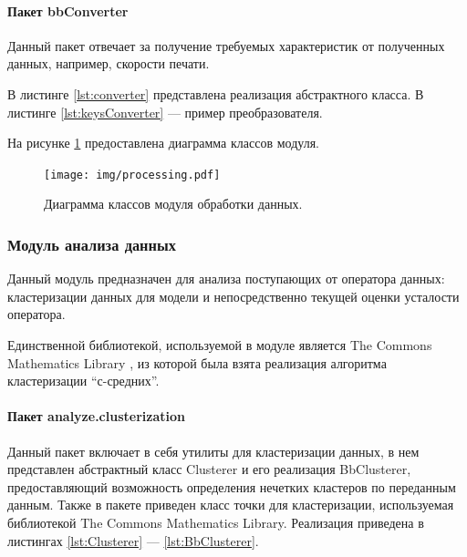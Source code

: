 

\paragraph{Пакет bbConverter \newline}
Данный пакет отвечает за получение требуемых характеристик от полученных данных, например, скорости печати.

В листинге \ref{lst:converter} представлена реализация абстрактного класса. В листинге \ref{lst:keysConverter} --- пример преобразователя.





На рисунке \ref{fig:processingUml} предоставлена диаграмма классов модуля.
\begin{figure}[H]
	\centering
	\texttt{[image: img/processing.pdf]}
	\caption{Диаграмма классов модуля обработки данных.}
	\label{fig:processingUml}
\end{figure}

\subsubsection{Модуль анализа данных}
Данный модуль предназначен для анализа поступающих от оператора данных: кластеризации данных для модели и непосредственно текущей оценки усталости оператора.

Единственной библиотекой, используемой в модуле является The Commons Mathematics Library \cite{apachemath3}, из которой была взята реализация алгоритма кластеризации ``с-средних''.

\paragraph{Пакет analyze.clusterization \newline}

Данный пакет включает в себя утилиты для кластеризации данных, в нем представлен абстрактный класс Clusterer и его реализация BbClusterer, предоставляющий возможность определения нечетких кластеров по переданным данным. Также в пакете приведен класс точки для кластеризации, используемая библиотекой The Commons Mathematics Library. Реализация приведена в листингах \ref{lst:Clusterer} --- \ref{lst:BbClusterer}.

